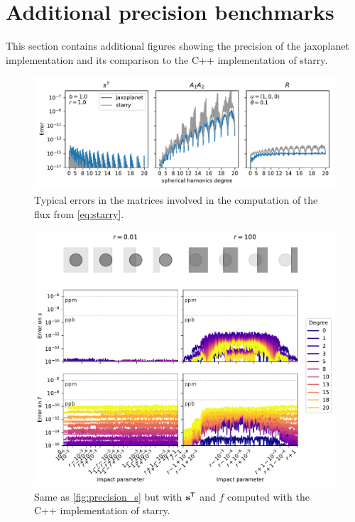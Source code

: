 \documentclass[modern]{aastex631}
\begin{document}
\section{Additional precision benchmarks}\label{precise_precision}
This section contains additional figures showing the precision of the \textsf{jaxoplanet} implementation and its comparison to the C++ implementation of \textsf{starry}.
\begin{figure}[H]
    \begin{center}
        \includegraphics[width=\textwidth]{../workflows/precision/figures/error_SAR.pdf}
        \caption{Typical errors in the matrices involved in the computation of the flux from \autoref{eq:starry}. }
        \label{fig:precision_SAR}
    \end{center}
\end{figure}
\begin{figure}[H]
    \begin{center}
        \includegraphics[width=\textwidth]{../workflows/precision/figures/error_starry.pdf}
        \caption{Same as \autoref{fig:precision_s} but with ${\mathbf{s}}^\mathsf{T}$ and $f$ computed with the C++ implementation of \textsf{starry}. }
        \label{fig:precision_s_starry}
    \end{center}
\end{figure}
\end{document}
